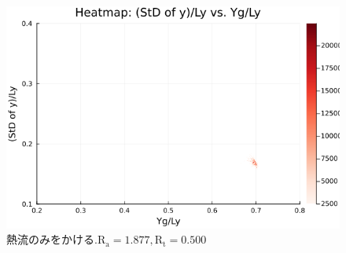\begin{figure}[H]
  \centering
  \includegraphics[scale=0.6]{image/g0_heat/2024-01-15T14:07:36.228_mapg0_chiinf_Ay50_rho0.4_T0.43_dT0.04_Rd0.0_Rt0.5_Ra1.877538_g0_run4.0e7.png}
  \caption{$熱流のみをかける. \text{R}_\text{a}=1.877,\text{R}_\text{t}=0.500$}
  \label{}
\end{figure} 

